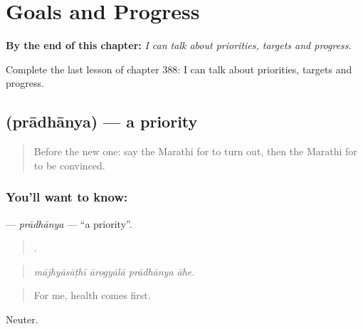 
\chapter{Goals and Progress}
\label{ch:mr-goals-and-progress}

\begin{chapteropening}
\textbf{By the end of this chapter:} \emph{I can talk about priorities, targets and progress.}

Complete the last lesson of chapter 388: I can talk about priorities, targets and progress.
\end{chapteropening}

\section[\texorpdfstring{\mr{प्राधान्य} (prādhānya)}{प्राधान्य (prādhānya)}]{ (prādhānya) — a priority}

\label{lesson:MR-C388-pradhanya}



\begin{quote}
Before the new one: say the Marathi for to turn out, then the Marathi for to be convinced.
\end{quote}

\subsection*{You'll want to know: }
\textbf{} — \emph{prādhānya} — \textquotedblleft{}a priority\textquotedblright{}.

\begin{quote}
   .
\end{quote}

\begin{quote}
\emph{mājhyāsāṭhī ārogyālā prādhānya āhe.}
\end{quote}

\begin{quote}
For me, health comes first.
\end{quote}

Neuter.

